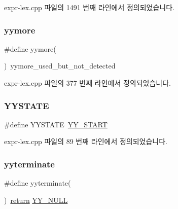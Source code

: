 expr-\/lex.\+cpp 파일의 1491 번째 라인에서 정의되었습니다.

\mbox{\label{expr-lex_8cpp_a745d37b5e002b2e5f93ad42ea7b554be}} 
\subsubsection{\texorpdfstring{yymore}{yymore}}
{\footnotesize\ttfamily \#define yymore(\begin{DoxyParamCaption}{ }\end{DoxyParamCaption})~yymore\+\_\+used\+\_\+but\+\_\+not\+\_\+detected}



expr-\/lex.\+cpp 파일의 377 번째 라인에서 정의되었습니다.

\mbox{\label{expr-lex_8cpp_a32b5b960944f946b192d54f672569cd9}} 
\subsubsection{\texorpdfstring{Y\+Y\+S\+T\+A\+TE}{YYSTATE}}
{\footnotesize\ttfamily \#define Y\+Y\+S\+T\+A\+TE~\mbox{\hyperlink{expr-lex_8cpp_a8e14785f9eab7a997d659b25af9584c5}{Y\+Y\+\_\+\+S\+T\+A\+RT}}}



expr-\/lex.\+cpp 파일의 89 번째 라인에서 정의되었습니다.

\mbox{\label{expr-lex_8cpp_ac3286b18a2e91b4571b97df96a118e84}} 
\subsubsection{\texorpdfstring{yyterminate}{yyterminate}}
{\footnotesize\ttfamily \#define yyterminate(\begin{DoxyParamCaption}{ }\end{DoxyParamCaption})~\mbox{\hyperlink{gb_codes_c_b_8h_a9717e7bbecb906637e86cef6da3d83c2}{return}} \mbox{\hyperlink{expr-lex_8cpp_a8e0bcf8f8a5b613ea583347f8bc31cbf}{Y\+Y\+\_\+\+N\+U\+LL}}}



